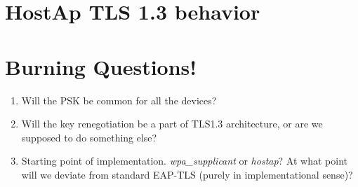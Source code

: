 \documentclass[12pt]{article}
\begin{document}
\section{HostAp TLS 1.3 behavior}

\section{Burning Questions!}

\begin{enumerate}
	\item{Will the PSK be common for all the devices?}
	\item{Will the key renegotiation be a part of TLS1.3 architecture, or are we supposed to do something else?}
	\item{Starting point of implementation. \emph{wpa\_supplicant} or \emph{hostap}? At what point will we deviate from standard EAP-TLS (purely in implementational sense)?}
	
\end{enumerate}
\end{document}
